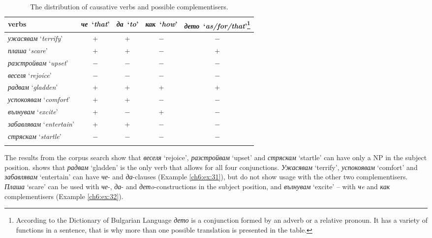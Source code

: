 \documentclass[output=paper,colorlinks,citecolor=brown]{langscibook}
\begin{document}
\begin{table}
    \begin{tabular}{l *4{c}} 
    \lsptoprule
         verbs& \textit{че}~`\textit{that}' & \textit{да}~`\textit{to}'&  \textit{как}~`\textit{how}' & \textit{дето}~`\textit{as/for/that}'{\footnote{According to the Dictionary of Bulgarian Language \textit{дето} is a conjunction formed by an adverb or a relative pronoun. It has a variety of functions in a sentence, that is why more than one possible translation is presented in the table.}}\\ 
         \midrule
        \textit{ужасявам} `\textit{terrify}'&  +&  +&  −& −\\
        \textit{плаша} `\textit{scare}'&  +&  +&  −& +\\
        \textit{разстройвам} `\textit{upset}'&  −&  −&  −& −\\
        \textit{веселя} `\textit{rejoice}'&  −&  −&  −& −\\
        \textit{радвам} `\textit{gladden}'&  +&  +&  +& +\\
        \textit{успокоявам} `\textit{comfort}'&  +&  +&  −& −\\
        \textit{вълнувам} `\textit{excite}'&  +&  −&  +& −\\
        \textit{забавлявам} `\textit{entertain}'&  +&  +&  −& −\\
        \textit{стряскам} `\textit{startle}'&  −&  −&  −& −\\
    \lspbottomrule
    \end{tabular}
    \caption{The distribution of causative verbs and possible complementisers.}
    \label{tab:distributioncausative}
\end{table}

The results from the corpus search show that \textit{веселя} `rejoice', \textit{разстройвам} `upset' and \textit{стряскам} `startle' can have only a NP in the subject position.  shows that \textit{радвам} `gladden' is the only verb that allows for all four conjunctions. \textit{Ужасявам} `terrify', \textit{успокоявам} `comfort' and \textit{забавлявам} `entertain' can have \textit{че}- and \textit{да}-clauses (Example \ref{ch6:ex:31}), but do not show usage with the other two complementisers. \textit{Плаша} `scare' can be used with \textit{че}-, \textit{да}- and \textit{детo}-constructions in the subject position, and \textit{вълнувам} `excite' – with \textit{чe} and \textit{как} complementisers (Example \ref{ch6:ex:32}).
\end{document}
